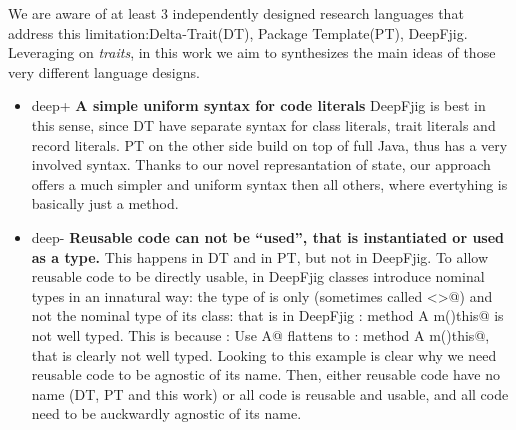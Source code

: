 We are aware of at least 3 independently designed research languages 
that address this limitation:Delta-Trait(DT)\cite{ferruccioworks}, Package Template(PT)\cite{}, DeepFjig\cite{}.
Leveraging on \emph{traits}, in this work we aim to synthesizes
the main ideas of those very different language designs.

\begin{itemize}
\item deep+ {\bf A simple uniform syntax for code literals}
DeepFjig is best in this sense, since DT have separate syntax for class literals, trait literals and record literals.
PT on the other side build on top of full Java, thus has a very involved syntax.
Thanks to our novel represantation of state, our approach offers a much simpler and uniform syntax then
all others, where evertyhing is basically just a method.
\item deep-
{\bf Reusable code can not be ``used'', that is instantiated or used as a type.}
This happens in DT and in PT, but not in DeepFjig. To allow reusable code to be directly 
usable, in DeepFjig
classes introduce nominal types in an innatural way: the type of \Q@this@ is only \Q@This@ (sometimes called \Q@<>@) and not the nominal type of its class: that is in DeepFjig 
\Q@A:{ method A m()this}@ is not well typed. This is because
\Q@B: Use A@ flattens to \Q@B:{ method A m()this}@, that is clearly not well typed.
Looking to this example is clear why we need reusable code to be agnostic of its name.
Then, either reusable code have no name (DT, PT and this work)
or all code is reusable and usable, and all code need to be auckwardly agnostic of its name.


\end{itemize}
